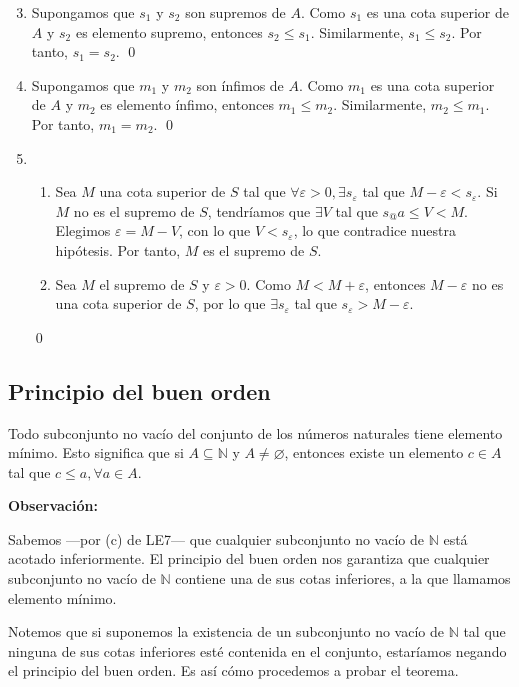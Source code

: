 \documentclass[11pt]{article}
\newcommand{\N}{\mathbb{N}}
\let\epsilon\varepsilon
\let\emptyset\varnothing
\begin{document}
\begin{enumerate}[label=\arabic*.]\setcounter{enumi}{2}
    \item Supongamos que $s_1$ y $s_2$ son supremos de $A$. Como $s_1$ es una cota superior de $A$ y $s_2$ es elemento supremo, entonces $s_2\leq s_1$. Similarmente, $s_1\leq s_2$. Por tanto, $s_1=s_2$. \qed
    \item Supongamos que $m_1$ y $m_2$ son ínfimos de $A$. Como $m_1$ es una cota superior de $A$ y $m_2$ es elemento ínfimo, entonces $m_1\leq m_2$. Similarmente, $m_2\leq m_1$. Por tanto, $m_1=m_2$. \qed
    \item \begin{enumerate}[label=\roman*)]
        \item Sea $M$ una cota superior de $S$ tal que $\forall \epsilon>0, \exists s_{\epsilon}$ tal que $M-\epsilon<s_{\epsilon}$. Si $M$ no es el supremo de $S$, tendríamos que $\exists V$ tal que $s_@a \leq V < M$. Elegimos $\epsilon = M-V$, con lo que $V<s_{\epsilon}$, lo que contradice nuestra hipótesis. Por tanto, $M$ es el supremo de $S$.
        \item Sea $M$ el supremo de $S$ y $\epsilon>0$. Como $M<M+\epsilon$, entonces $M-\epsilon$ no es una cota superior de $S$, por lo que $\exists s_\epsilon$ tal que $s_\epsilon>M-\epsilon$.
        \end{enumerate} \qed
\end{enumerate}

\subsection*{Principio del buen orden}

Todo subconjunto no vacío del conjunto de los números naturales tiene elemento mínimo. Esto significa que si $A\subseteq \N$ y $A \neq \emptyset$, entonces existe un elemento $c\in A$ tal que $c\leq a, \forall a\in A$.

\textbf{Observación:}

Sabemos —por (c) de LE7— que cualquier subconjunto no vacío de $\N$ está acotado inferiormente. El principio del buen orden nos garantiza que cualquier subconjunto no vacío de $\N$ contiene una de sus cotas inferiores, a la que llamamos elemento mínimo.

Notemos que si suponemos la existencia de un subconjunto no vacío de $\N$ tal que ninguna de sus cotas inferiores esté contenida en el conjunto, estaríamos negando el principio del buen orden. Es así cómo procedemos a probar el teorema.
\end{document}
